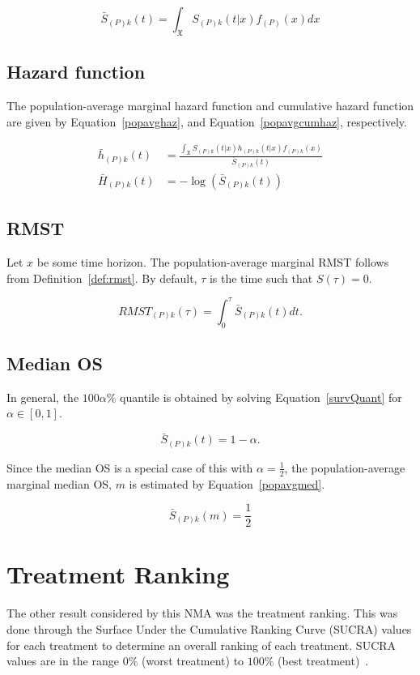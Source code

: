 \begin{equation}
    \bar{S}_{(P)k}(t) = \int_{\mathfrak{X}}S_{(P)k}(t|x)f_{(P)}(x)dx
    \label{popavgS}
\end{equation}

\subsection{Hazard function}
The population-average marginal hazard function and cumulative hazard function are given by Equation~\ref{popavghaz}, and Equation~\ref{popavgcumhaz}, respectively.

\begin{align}
    \bar{h}_{(P)k}(t) &= \frac{\int_{\mathfrak{X}}S_{(P)k}(t|x)h_{(P)k}(t|x)f_{(P)k}(x)}{\bar{S}_{(P)k}(t)} \label{popavghaz}\\
    \bar{H}_{(P)k}(t) &= -\log(\bar{S}_{(P)k}(t)) \label{popavgcumhaz}
\end{align}

\subsection{RMST}
Let $x$ be some time horizon. The population-average marginal RMST follows from Definition~\ref{def:rmst}. By default, $\tau$ is the time such that $S(\tau) = 0$.

\begin{equation}
    RMST_{(P)k}(\tau) = \int^{\tau}_{0} \bar{S}_{(P)k}(t)dt.
\end{equation}

\subsection{Median OS}
In general, the $100\alpha\%$ quantile is obtained by solving Equation~\ref{survQuant} for $\alpha \in [0, 1]$.

\begin{equation}
    \bar{S}_{(P)k}(t) = 1 - \alpha.
    \label{survQuant}
\end{equation}

Since the median OS is a special case of this with $\alpha = \frac{1}{2}$, the population-average marginal median OS, $m$ is estimated by Equation~\ref{popavgmed}. 

\begin{equation}
    \bar{S}_{(P)k}(m) = \frac{1}{2}
    \label{popavgmed}
\end{equation}

\section{Treatment Ranking}
The other result considered by this NMA was the treatment ranking. This was done through the Surface Under the Cumulative Ranking Curve (SUCRA) values for each treatment to determine an overall ranking of each treatment. SUCRA values are in the range $0\%$ (worst treatment) to $100\%$ (best treatment)~\cite{mbuag}.

